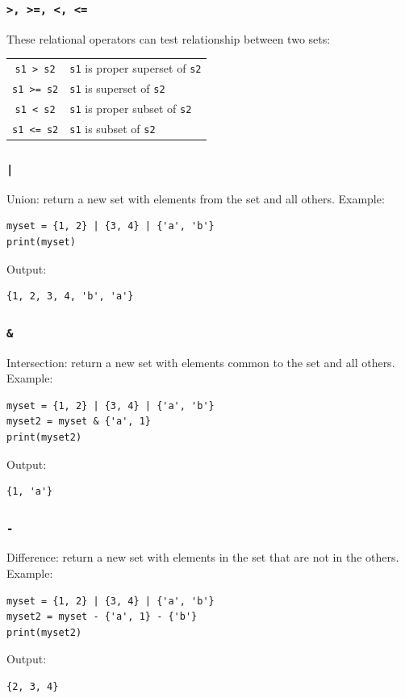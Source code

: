 \documentclass[12pt]{book}
\begin{document}
\subsubsection{\texttt{>, >=, <, <=}}
\label{sec:orgf23cc26}
These relational operators can test relationship between two sets:
\begin{center}
\begin{tabular}{cl}
\hline
\texttt{s1 > s2} & \texttt{s1} is proper superset of \texttt{s2}\\
\texttt{s1 >= s2} & \texttt{s1} is superset of \texttt{s2}\\
\texttt{s1 < s2} & \texttt{s1} is proper subset of \texttt{s2}\\
\texttt{s1 <= s2} & \texttt{s1} is subset of \texttt{s2}\\
\hline
\end{tabular}
\end{center}

\subsubsection{\texttt{|}}
\label{sec:orgd333c80}
Union: return a new set with elements from the set and all others. Example:
\begin{verbatim}
myset = {1, 2} | {3, 4} | {'a', 'b'}
print(myset)
\end{verbatim}
Output:
\begin{verbatim}
{1, 2, 3, 4, 'b', 'a'}
\end{verbatim}

\subsubsection{\texttt{\&}}
\label{sec:org5814cf2}
Intersection: return a new set with elements common to the set and all others. Example:
\begin{verbatim}
myset = {1, 2} | {3, 4} | {'a', 'b'}
myset2 = myset & {'a', 1}
print(myset2)
\end{verbatim}
Output:
\begin{verbatim}
{1, 'a'}
\end{verbatim}

\subsubsection{\texttt{-}}
\label{sec:org8dcfaa2}
Difference: return a new set with elements in the set that are not in the others. Example:
\begin{verbatim}
myset = {1, 2} | {3, 4} | {'a', 'b'}
myset2 = myset - {'a', 1} - {'b'}
print(myset2)
\end{verbatim}
Output:
\begin{verbatim}
{2, 3, 4}
\end{verbatim}
\end{document}
